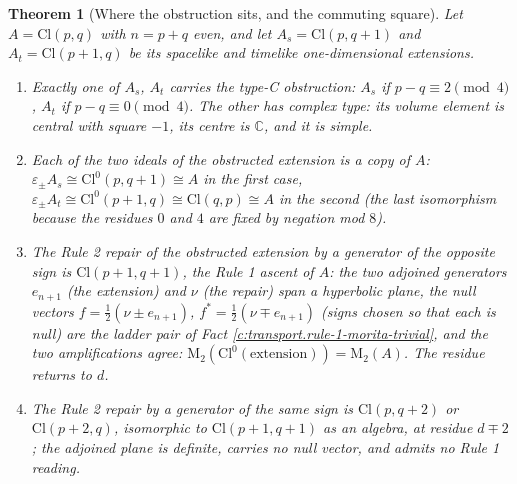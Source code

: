 \documentclass[11pt]{article}
\newtheorem{theorem}{Theorem}[section]
\theoremstyle{definition}
\theoremstyle{plain}
\providecommand{\C}{}\renewcommand{\C}{\mathbb{C}}
\providecommand{\Cl}{}\renewcommand{\Cl}{\mathrm{Cl}}
\providecommand{\Mat}{}\renewcommand{\Mat}{\mathrm{M}}
\begin{document}
\begin{theorem}[Where the obstruction sits, and the commuting square]\label{c:rule2.where-obstruction-sits-commuting-square}
Let $A = \Cl(p,q)$ with $n = p + q$ even, and let $A_s = \Cl(p,q{+}1)$ and $A_t = \Cl(p{+}1,q)$ be its spacelike and timelike one-dimensional extensions.
\begin{enumerate}
\item[(a)] Exactly one of $A_s$, $A_t$ carries the type-C obstruction: $A_s$ if $p - q \equiv 2 \pmod 4$, $A_t$ if $p - q \equiv 0 \pmod 4$. The other has complex type: its volume element is central with square $-1$, its centre is $\C$, and it is simple.
\item[(b)] Each of the two ideals of the obstructed extension is a copy of $A$: $\varepsilon_\pm A_s \cong \Cl^0(p,q{+}1) \cong A$ in the first case, $\varepsilon_\pm A_t \cong \Cl^0(p{+}1,q) \cong \Cl(q,p) \cong A$ in the second (the last isomorphism because the residues $0$ and $4$ are fixed by negation mod $8$).
\item[(c)] The Rule 2 repair of the obstructed extension by a generator of the opposite sign is $\Cl(p{+}1,q{+}1)$, the Rule 1 ascent of $A$: the two adjoined generators $e_{n+1}$ (the extension) and $\nu$ (the repair) span a hyperbolic plane, the null vectors $f = \tfrac12(\nu \pm e_{n+1})$, $f^* = \tfrac12(\nu \mp e_{n+1})$ (signs chosen so that each is null) are the ladder pair of Fact \ref{c:transport.rule-1-morita-trivial}, and the two amplifications agree: $\Mat_2(\Cl^0(\text{extension})) = \Mat_2(A)$. The residue returns to $d$.
\item[(d)] The Rule 2 repair by a generator of the same sign is $\Cl(p,q{+}2)$ or $\Cl(p{+}2,q)$, isomorphic to $\Cl(p{+}1,q{+}1)$ as an algebra, at residue $d \mp 2$; the adjoined plane is definite, carries no null vector, and admits no Rule 1 reading.
\end{enumerate}
\end{theorem}
\end{document}
